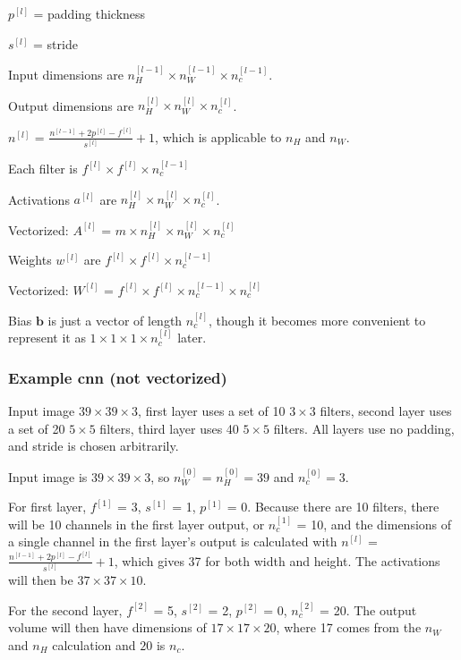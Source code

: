 \documentclass[12pt]{article}
\begin{document}
$p^{[l]}$ = padding thickness

$s^{[l]}$ = stride

Input dimensions are $n_H^{[l-1]} \times n_W^{[l-1]} \times n_c^{[l-1]}$.

Output dimensions are $n_H^{[l]} \times n_W^{[l]} \times n_c^{[l]}$.

$n^{[l]}$ = $\frac{n^{[l-1]}+2p^{[l]}-f^{[l]}}{s^{[l]}} + 1$, which is applicable to $n_H$ and $n_W$.

Each filter is $f^{[l]} \times f^{[l]} \times n_c^{[l-1]}$

Activations $a^{[l]}$ are $n_H^{[l]} \times n_W^{[l]} \times n_c^{[l]}$.

Vectorized: $A^{[l]}$ = $m \times n_H^{[l]} \times n_W^{[l]} \times n_c^{[l]}$

Weights $w^{[l]}$ are $f^{[l]} \times f^{[l]} \times n_c^{[l-1]}$

Vectorized: $W^{[l]}$ = $f^{[l]} \times f^{[l]} \times n_c^{[l-1]} \times n_c^{[l]}$

Bias $\bm b$ is just a vector of length $n_c^{[l]}$, though it becomes more convenient
to represent it as $1 \times 1 \times 1 \times n_c^{[l]}$ later.

\subsubsection{Example cnn (not vectorized)}

Input image $39 \times 39 \times 3$, first layer uses a set of 10 $3 \times 3$ filters,
second layer uses a set of 20 $5 \times 5$ filters, third layer uses 40 $5 \times 5$
filters. All layers use no padding, and stride is chosen arbitrarily.

Input image is $39 \times 39 \times 3$, so $n_W^{[0]}$ = $n_H^{[0]} = 39$
and $n_c^{[0]} = 3$.

For first layer, $f^{[1]}$ = 3, $s^{[1]}$ = 1, $p^{[1]}$ = 0. Because there are 10 filters,
there will be 10 channels in the first layer output, or $n_c^{[1]}$ = 10, and the dimensions
of a single channel in the first layer's output is calculated with $n^{[l]}$ =
$\frac{n^{[l-1]}+2p^{[l]}-f^{[l]}}{s^{[l]}} + 1$, which gives 37 for both width and height.
The activations will then be $37 \times 37 \times 10$.

For the second layer, $f^{[2]}$ = 5, $s^{[2]}$ = 2, $p^{[2]}$ = 0, $n_c^{[2]}$ = 20. The
output volume will then have dimensions of $17 \times 17 \times 20$, where 17 comes from
the $n_W$ and $n_H$ calculation and $20$ is $n_c$.
\end{document}
